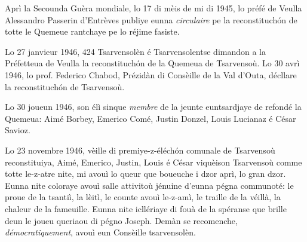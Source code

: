 


\DramPer


Aprì la Secounda Guèra mondiale, lo 17 di mèis de mi di 1945, lo préfé de Veulla Alessandro Passerin d'Entrèves publiye eunna \textit{circulaire} pe la reconstituch\'on de totte le Quemeue ran\-tchaye pe lo réjime fasiste.

Lo 27 janvieur 1946, 424 Tsarvensolèn é Tsarvensolentse dimandon a la Préfetteua de Veulla la reconstituch\'on de la Quemeua de Tsarvensoù. Lo 30 avrì 1946, lo prof. Federico Chabod, Prézidàn di Consèille de la Val d'Outa, décllare la reconstituch\'on de Tsarvensoù.

Lo 30 joueun 1946, son élì sinque \textit{membre} de la jeunte eun\-tsardjaye de refondé la Quemeua: Aimé Borbey, Emerico Comé, Justin Donzel, Louis Lucianaz é César Savioz.

Lo 23 novembre 1946, vèille di premiye-z-éléch\'on comunale de Tsarvensoù reconstituiya, Aimé, Emerico, Justin, Louis é César viquèison Tsarvensoù comme totte le-z-atre nite, mi avouì lo queur que  boueuche i dzor aprì, lo gran dzor. Eunna nite coloraye avouì salle attivitoù jénuine d'eunna pégna communoté: le proue de la tsantiì, la lèitì, le counte avouì le-z-amì, le traille de la véillà, la chaleur de la fameuille. Eunna nite icllériaye di fouà de la spéranse que brille deun le joueu  queriaou di pégno Joseph. Demàn se recomenche, \textit{démocratiquement}, avouì eun Consèille tsarvensolèn.

\DeriLeRido
{}
